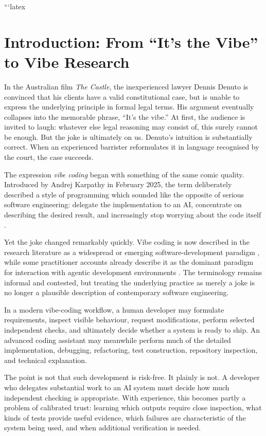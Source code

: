 ```latex

\section{Introduction: From ``It's the Vibe'' to Vibe Research}

In the Australian film \emph{The Castle}, the inexperienced lawyer Dennis Denuto is convinced that his clients have a valid constitutional case, but is unable to express the underlying principle in formal legal terms. His argument eventually collapses into the memorable phrase, ``It's the vibe.'' At first, the audience is invited to laugh: whatever else legal reasoning may consist of, this surely cannot be enough. But the joke is ultimately on us. Denuto's intuition is substantially correct. When an experienced barrister reformulates it in language recognised by the court, the case succeeds.

The expression \emph{vibe coding} began with something of the same comic quality. Introduced by Andrej Karpathy in February 2025, the term deliberately described a style of programming which sounded like the opposite of serious software engineering: delegate the implementation to an AI, concentrate on describing the desired result, and increasingly stop worrying about the code itself \citep{fowler2026vibecoding}.

Yet the joke changed remarkably quickly. Vibe coding is now described in the research literature as a widespread or emerging software-development paradigm \citep{meskeEtAl2025vibecoding,sarkarDrosos2025vibecoding}, while some practitioner accounts already describe it as the dominant paradigm for interaction with agentic development environments \citep{nimblabs2026vibecoding}. The terminology remains informal and contested, but treating the underlying practice as merely a joke is no longer a plausible description of contemporary software engineering.

In a modern vibe-coding workflow, a human developer may formulate requirements, inspect visible behaviour, request modifications, perform selected independent checks, and ultimately decide whether a system is ready to ship. An advanced coding assistant may meanwhile perform much of the detailed implementation, debugging, refactoring, test construction, repository inspection, and technical explanation.

The point is not that such development is risk-free. It plainly is not. A developer who delegates substantial work to an AI system must decide how much independent checking is appropriate. With experience, this becomes partly a problem of calibrated trust: learning which outputs require close inspection, what kinds of tests provide useful evidence, which failures are characteristic of the system being used, and when additional verification is needed.

